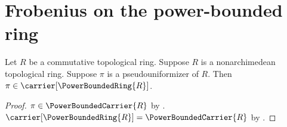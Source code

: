 



\section{Frobenius on the power-bounded ring}

\begin{classification}\label{pseudouniformizer_in_power_bounded_ring}
    Let $R$ be a commutative topological ring.
    Suppose $R$ is a nonarchimedean topological ring.
    Suppose $\pi$ is a pseudouniformizer of $R$.
    Then $\pi\in\carrier[\PowerBoundedRing{R}]$.
\end{classification}
\begin{proof}
    $\pi\in\PowerBoundedCarrier{R}$ by
        .
    $\carrier[\PowerBoundedRing{R}]=\PowerBoundedCarrier{R}$ by
        .
\end{proof}

